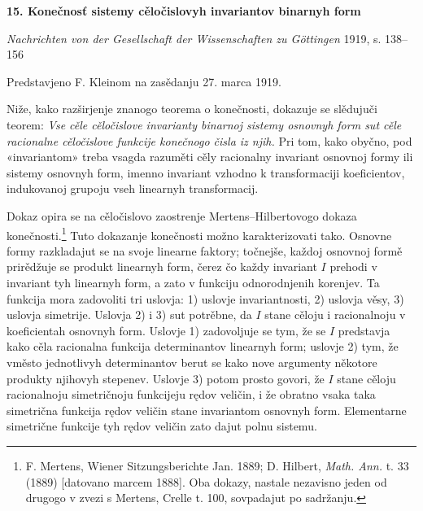 \documentclass[11pt]{article}
\begin{document}

\begin{center}
{\Large\bfseries 15. Konečnosť sistemy cěločislovyh invariantov binarnyh form\par}
\vspace{1em}
\emph{Nachrichten von der Gesellschaft der Wissenschaften zu Göttingen} 1919, s. 138--156
\end{center}

\vspace{2em}
\begin{center}
Predstavjeno F. Kleinom na zasědanju 27. marca 1919.
\end{center}

Niže, kako razširjenje znanogo teorema o konečnosti, dokazuje se slědujuči teorem:
{\itshape Vse cěle cěločislove invarianty binarnoj sistemy osnovnyh form sut cěle racionalne cěločislove funkcije konečnogo čisla iz njih.}
Pri tom, kako obyčno, pod «invariantom» treba vsagda razuměti cěly racionalny invariant osnovnoj formy ili sistemy osnovnyh form, imenno invariant vzhodno k transformaciji koeficientov, indukovanoj grupoju vseh linearnyh transformacij.

Dokaz opira se na cěločislovo zaostrenje Mertens--Hilbertovogo dokaza konečnosti.\footnote{F. Mertens, Wiener Sitzungsberichte Jan. 1889; D. Hilbert, \emph{Math. Ann.} t. 33 (1889) [datovano marcem 1888]. Oba dokazy, nastale nezavisno jeden od drugogo v zvezi s Mertens, Crelle t. 100, sovpadajut po sadržanju.}
Tuto dokazanje konečnosti možno karakterizovati tako. Osnovne formy razkladajut se na svoje linearne faktory; točnejše, každoj osnovnoj formě prirědžuje se produkt linearnyh form, čerez čo každy invariant \(I\) prehodi v invariant tyh linearnyh form, a zato v funkciju odnorodnjenih korenjev. Ta funkcija mora zadovoliti tri uslovja: 1) uslovje invariantnosti, 2) uslovja věsy, 3) uslovja simetrije. Uslovja 2) i 3) sut potrěbne, da \(I\) stane cěloju i racionalnoju v koeficientah osnovnyh form. Uslovje 1) zadovoljuje se tym, že se \(I\) predstavja kako cěla racionalna funkcija determinantov linearnyh form; uslovje 2) tym, že vměsto jednotlivyh determinantov berut se kako nove argumenty někotore produkty njihovyh stepenev. Uslovje 3) potom prosto govori, že \(I\) stane cěloju racionalnoju simetričnoju funkcijeju rędov veličin, i že obratno vsaka taka simetrična funkcija rędov veličin stane invariantom osnovnyh form. Elementarne simetrične funkcije tyh rędov veličin zato dajut polnu sistemu.
\end{document}
